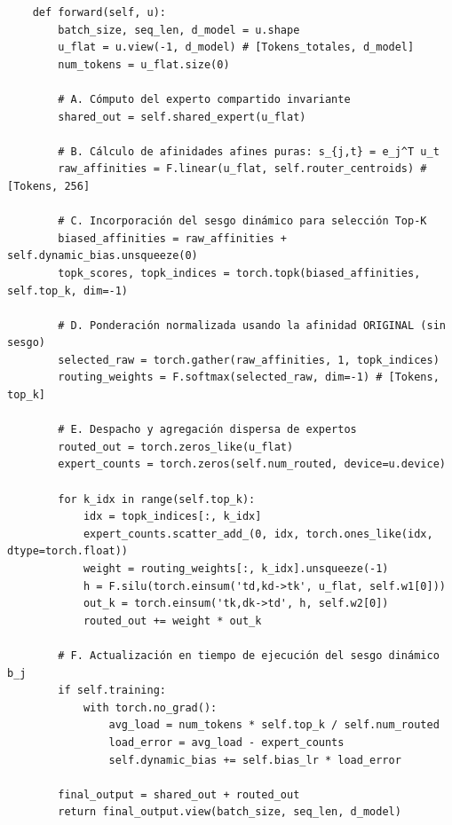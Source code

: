 \begin{tcolorbox}[colback=bg_marfil, colframe=unmsm_gold, arc=3pt, boxrule=0.6pt, top=0.2cm, bottom=0.2cm, left=0.4cm, right=0.4cm]
\scriptsize\ttfamily
\begin{verbatim}
    def forward(self, u):
        batch_size, seq_len, d_model = u.shape
        u_flat = u.view(-1, d_model) # [Tokens_totales, d_model]
        num_tokens = u_flat.size(0)
        
        # A. Cómputo del experto compartido invariante
        shared_out = self.shared_expert(u_flat)
        
        # B. Cálculo de afinidades afines puras: s_{j,t} = e_j^T u_t
        raw_affinities = F.linear(u_flat, self.router_centroids) # [Tokens, 256]
        
        # C. Incorporación del sesgo dinámico para selección Top-K
        biased_affinities = raw_affinities + self.dynamic_bias.unsqueeze(0)
        topk_scores, topk_indices = torch.topk(biased_affinities, self.top_k, dim=-1)
        
        # D. Ponderación normalizada usando la afinidad ORIGINAL (sin sesgo)
        selected_raw = torch.gather(raw_affinities, 1, topk_indices)
        routing_weights = F.softmax(selected_raw, dim=-1) # [Tokens, top_k]
        
        # E. Despacho y agregación dispersa de expertos
        routed_out = torch.zeros_like(u_flat)
        expert_counts = torch.zeros(self.num_routed, device=u.device)
        
        for k_idx in range(self.top_k):
            idx = topk_indices[:, k_idx]
            expert_counts.scatter_add_(0, idx, torch.ones_like(idx, dtype=torch.float))
            weight = routing_weights[:, k_idx].unsqueeze(-1)
            h = F.silu(torch.einsum('td,kd->tk', u_flat, self.w1[0]))
            out_k = torch.einsum('tk,dk->td', h, self.w2[0])
            routed_out += weight * out_k
            
        # F. Actualización en tiempo de ejecución del sesgo dinámico b_j
        if self.training:
            with torch.no_grad():
                avg_load = num_tokens * self.top_k / self.num_routed
                load_error = avg_load - expert_counts
                self.dynamic_bias += self.bias_lr * load_error
                
        final_output = shared_out + routed_out
        return final_output.view(batch_size, seq_len, d_model)
\end{verbatim}
\end{tcolorbox}

